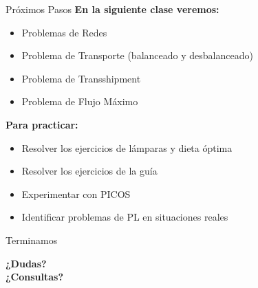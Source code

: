 \documentclass{beamer}
\begin{document}
\begin{frame}{Próximos Pasos}
    \textbf{En la siguiente clase veremos:}
    \begin{itemize}
        \item Problemas de Redes
        \item Problema de Transporte (balanceado y desbalanceado)
        \item Problema de Transshipment
        \item Problema de Flujo Máximo
    \end{itemize}
    
    \vspace{1em}
    \textbf{Para practicar:}
    \begin{itemize}
        \item Resolver los ejercicios de lámparas y dieta óptima
        \item Resolver los ejercicios de la guía
        \item Experimentar con PICOS
        \item Identificar problemas de PL en situaciones reales
    \end{itemize}
\end{frame}

\begin{frame}{Terminamos}
    \begin{center}
        \Large{\textbf{¿Dudas?\\¿Consultas?}}
    \end{center}
\end{frame}
\end{document}
